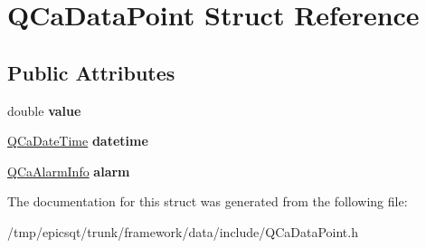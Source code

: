 \hypertarget{structQCaDataPoint}{
\section{QCaDataPoint Struct Reference}
\label{structQCaDataPoint}
}
\subsection*{Public Attributes}
\begin{DoxyCompactItemize}
\item 
\hypertarget{structQCaDataPoint_afab8e8d9aaabafd6736c8f0f5334e016}{
double {\bfseries value}}
\label{structQCaDataPoint_afab8e8d9aaabafd6736c8f0f5334e016}

\item 
\hypertarget{structQCaDataPoint_af917dac7805ec85536881ddef0d999b7}{
\hyperlink{classQCaDateTime}{QCaDateTime} {\bfseries datetime}}
\label{structQCaDataPoint_af917dac7805ec85536881ddef0d999b7}

\item 
\hypertarget{structQCaDataPoint_a16b3a5b86a63892d9ab19ffc4754a972}{
\hyperlink{classQCaAlarmInfo}{QCaAlarmInfo} {\bfseries alarm}}
\label{structQCaDataPoint_a16b3a5b86a63892d9ab19ffc4754a972}

\end{DoxyCompactItemize}


The documentation for this struct was generated from the following file:\begin{DoxyCompactItemize}
\item 
/tmp/epicsqt/trunk/framework/data/include/QCaDataPoint.h\end{DoxyCompactItemize}
